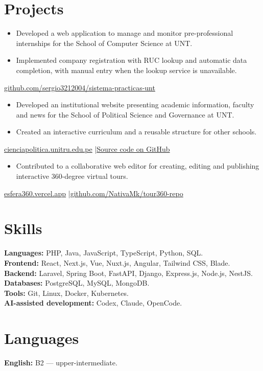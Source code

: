 \section{Projects}
\begin{itemize}
\item Developed a web application to manage and monitor pre-professional internships for the School of Computer Science at UNT.
\item Implemented company registration with RUC lookup and automatic data completion, with manual entry when the lookup service is unavailable.
\end{itemize}
{\small \href{https://github.com/sergio3212004/sistema-practicas-unt}{github.com/sergio3212004/sistema-practicas-unt}}\par
\vspace{4pt}
\begin{itemize}
\item Developed an institutional website presenting academic information, faculty and news for the School of Political Science and Governance at UNT.
\item Created an interactive curriculum and a reusable structure for other schools.
\end{itemize}
{\small \href{https://cienciapolitica.unitru.edu.pe}{cienciapolitica.unitru.edu.pe} \enspace |\enspace \href{https://github.com/sergio3212004/pagina-ciencia-politica-unt}{Source code on GitHub}}\par
\vspace{4pt}
\begin{itemize}
\item Contributed to a collaborative web editor for creating, editing and publishing interactive 360-degree virtual tours.
\end{itemize}
{\small \href{https://esfera360.vercel.app/}{esfera360.vercel.app} \enspace |\enspace \href{https://github.com/NativaMk/tour360-repo}{github.com/NativaMk/tour360-repo}}

\section{Skills}
\textbf{Languages:} PHP, Java, JavaScript, TypeScript, Python, SQL.\\
\textbf{Frontend:} React, Next.js, Vue, Nuxt.js, Angular, Tailwind CSS, Blade.\\
\textbf{Backend:} Laravel, Spring Boot, FastAPI, Django, Express.js, Node.js, NestJS.\\
\textbf{Databases:} PostgreSQL, MySQL, MongoDB.\\
\textbf{Tools:} Git, Linux, Docker, Kubernetes.\\
\textbf{AI-assisted development:} Codex, Claude, OpenCode.

\section{Languages}
\textbf{English:} B2 --- upper-intermediate.

